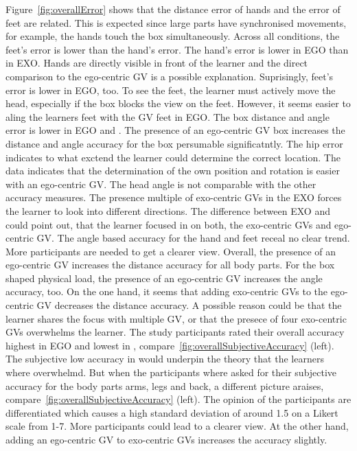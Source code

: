 Figure~\ref{fig:overallError} shows that the distance error of hands and the error of feet are related. This is expected since large parts have synchronised movements, for example, the hands touch the box simultaneously. Across all conditions, the feet's error is lower than the hand's error. The hand's error is lower in EGO than in EXO. Hands are directly visible in front of the learner and the direct comparison to the ego-centric GV is a possible explanation. Suprisingly, feet's error is lower in EGO, too. To see the feet, the learner must actively move the head, especially if the box blocks the view on the feet. However, it seems easier to aling the learners feet with the GV feet in EGO. The box distance and angle error is lower in EGO and \combi. The presence of an ego-centric GV box increases the distance and angle accuracy for the box persumable significatntly. The hip error indicates to what exctend the learner could determine the correct location. The data indicates that the determination of the own position and rotation is easier with an ego-centric GV. The head angle is not comparable with the other accuracy measures. The presence multiple of exo-centric GVs in the EXO forces the learner to look into different directions. The difference between EXO and \combi could point out, that the learner focused in \combi on both, the exo-centric GVs and ego-centric GV. The angle based accuracy for the hand and feet receal no clear trend. More participants are needed to get a clearer view. Overall, the presence of an ego-centric GV increases the distance accuracy for all body parts. For the box shaped physical load, the presence of an ego-centric GV increases the angle accuracy, too. On the one hand, it seems that adding exo-centric GVs to the ego-centric GV decreases the distance accuracy. A possible reason could be that the learner shares the focus with multiple GV, or that the presece of four exo-centric GVs overwhelms the learner. The study participants rated their overall accuracy highest in EGO and lowest in \combi, compare~\ref{fig:overallSubjectiveAccuracy} (left). The subjective low accuracy in \combi would underpin the theory that the learners where overwhelmd. But when the participants where asked for their subjective accuracy for the body parts arms, legs and back, a different picture araises, compare~\ref{fig:overallSubjectiveAccuracy} (left). The opinion of the participants are differentiated which causes a high standard deviation of around 1.5 on a Likert scale from 1-7. More participants could lead to a clearer view. At the other hand, adding an ego-centric GV to exo-centric GVs increases the accuracy slightly.\\
